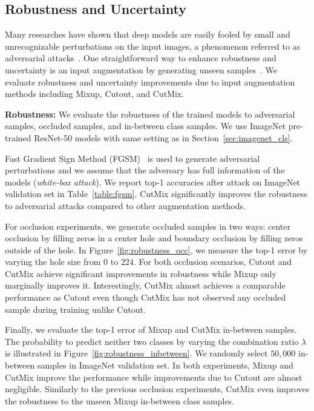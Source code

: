 

\subsection{Robustness and Uncertainty}
\label{sec:robustness}


Many researches have shown that deep models are easily fooled by small and unrecognizable perturbations on the input images, a phenomenon referred to as adversarial attacks~\cite{fgsm, szegedy2013intriguing}.
One straightforward way to enhance robustness and uncertainty is an input augmentation by generating unseen samples~\cite{madry2017towards}.
We evaluate robustness and uncertainty improvements due to input augmentation methods including Mixup, Cutout, and CutMix.

\noindent\textbf{Robustness: }
We evaluate the robustness of the trained models to adversarial samples, occluded samples, and in-between class samples.
We use ImageNet pre-trained ResNet-50 models with same setting as in Section~\ref{sec:imagenet_cls}.

Fast Gradient Sign Method (FGSM)~\cite{fgsm} is used to generate adversarial perturbations and we assume that the adversary has full information of the models (\textit{white-box attack}).
We report top-1 accuracies after attack on ImageNet validation set in Table~\ref{table:fgsm}. 
CutMix significantly improves the robustness to adversarial attacks compared to other augmentation methods.

For occlusion experiments, we generate occluded samples in two ways: center occlusion by filling zeros in a center hole and boundary occlusion by filling zeros outside of the hole.
In Figure~\ref{fig:robustness_occ}, we measure the top-1 error by varying the hole size from $0$ to $224$. For both occlusion scenarios, Cutout and CutMix achieve significant improvements in robustness while Mixup only marginally improves it.
Interestingly, CutMix almost achieves a comparable performance as Cutout even though CutMix has not observed any occluded sample during training unlike Cutout.

Finally, we evaluate the top-1 error of Mixup and CutMix in-between samples. 
The probability to predict neither two classes by varying the combination ratio $\lambda$ is illustrated in Figure~\ref{fig:robustness_inbetween}.
We randomly select $50,000$ in-between samples in ImageNet validation set.
In both experiments, Mixup and CutMix improve the performance while improvements due to Cutout are almost negligible.
Similarly to the previous occlusion experiments, CutMix even improves the robustness to the unseen Mixup in-between class samples.


